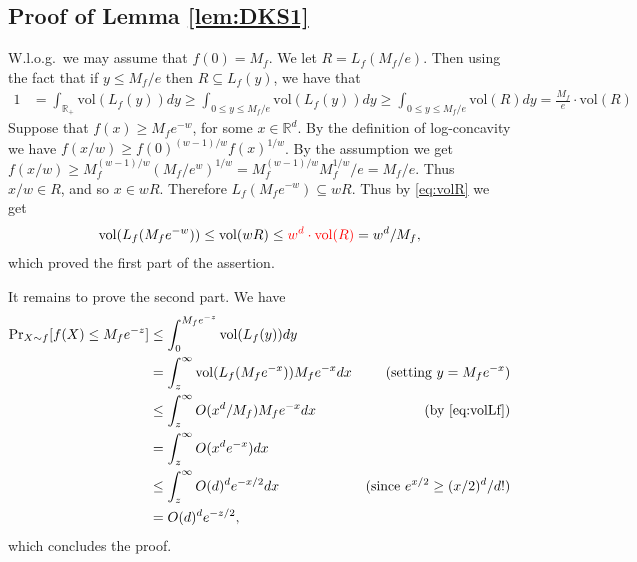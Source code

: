 \documentclass[final,12pt]{colt2018}
\newcommand{\nnew}[1]{{\color{red} #1}}
\newcommand{\nnew}[1]{#1}
\newtheorem{informal theorem}[theorem]{Theorem (informal statement)}
\newcommand{\vol}{\mathrm{vol}}
\begin{document}

\subsection{Proof of Lemma \ref{lem:DKS1}}

W.l.o.g.~we may assume that $f(0)=M_f$.
We let $R = L_{f}(M_{f} / e)$. Then using the fact that if $y \leq M_{f} / e$ then $R \subseteq L_{f}(y)$, we have that
\begin{align}
1 &= \int_{\mathbb{R}_+} \vol(L_{f}(y))dy 
\geq \int_{0 \leq y \leq M_{f} / e} \vol(L_{f}(y))dy 
\geq \int_{0 \leq y \leq M_{f} / e} \vol(R)dy 
= \frac{M_{f}}{e} \cdot \vol(R) \label{eq:volR}
\end{align}
Suppose that $f(x)\geq M_f e^{-w}$, for some $x\in \mathbb{R}^d$.
By the definition of log-concavity we have $f(x/w) \geq f(0)^{(w-1)/w}f(x)^{1/w}$.
By the assumption we get
$f(x/w) \geq M_f^{(w-1)/w} (M_f/e^w)^{1/w} = M_f^{(w-1)/w} M_f^{1/w} / e = M_f / e$.
Thus $x/w \in R$, and so $x \in wR$. 
Therefore $L_f(M_f e^{-w}) \subseteq wR$.
Thus by \eqref{eq:volR} we get
\begin{align}
\vol(L_{f}(M_{f} e^{-w})) \leq \vol(wR) \leq \nnew{w^d \cdot \vol(R)} = w^d / M_{f}, \label{eq:volLf}
\end{align}
which proved the first part of the assertion.

It remains to prove the second part.
We have
\begin{align*}
{\Pr}_{X\sim f}[f(X) \leq M_{f} e^{-z}] &\leq \int_{0}^{M_{f} e^{-z}} \vol(L_{f}(y)) dy &  \\
&= \int_{z}^{\infty} \vol(L_{f}(M_{f}e^{-x})) M_{f} e^{-x} dx  & \text{(setting $y=M_f e^{-x}$)} \\
&\leq \int_{z}^{\infty} O(x^d / M_{f}) M_{f} e^{-x} dx & \text{(by \eqref{eq:volLf})} \\
&= \int_{z}^{\infty} O(x^d e^{-x}) dx \\
&\leq \int_{z}^{\infty} O(d)^d e^{-x/2} dx & \text{(since $e^{x/2} \geq (x/2)^d / d!$)} \\
&= O(d)^d e^{-z/2},
\end{align*}
which concludes the proof.
\end{document}
